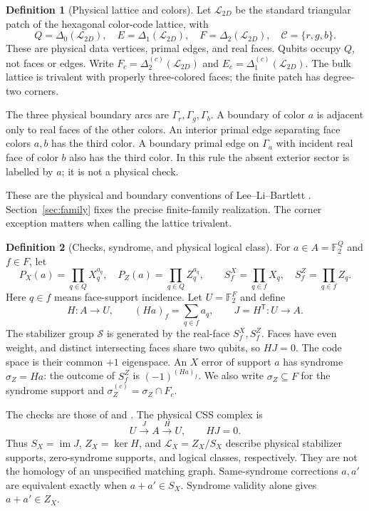 \documentclass[11pt]{article}
\theoremstyle{definition}
\newtheorem{definition}{Definition}[section]
\theoremstyle{plain}
\theoremstyle{remark}
\newcommand{\F}{\mathbb F_2}
\newcommand{\C}{\mathcal C}
\newcommand{\LL}{\mathcal L}
\begin{document}
\begin{definition}[Physical lattice and colors]\label{def:physical}
Let $\LL_{2D}$ be the standard triangular patch of the hexagonal color-code
lattice, with
\[
 Q=\Delta_0(\LL_{2D}),\quad E=\Delta_1(\LL_{2D}),\quad
 F=\Delta_2(\LL_{2D}),\quad \C=\{r,g,b\}.
\]
These are physical data vertices, primal edges, and real faces.
Qubits occupy $Q$, not faces or edges. Write
$F_c=\Delta_2^{(c)}(\LL_{2D})$ and $E_c=\Delta_1^{(c)}(\LL_{2D})$.
The bulk lattice is trivalent with properly three-colored faces; the
finite patch has degree-two corners.

The three physical boundary arcs are $\Gamma_r,\Gamma_g,\Gamma_b$.
A boundary of color $a$ is adjacent only to real faces of the other colors.
An interior primal edge separating face colors $a,b$ has the third color.
A boundary primal edge on $\Gamma_a$ with incident real face of color $b$
also has the third color. In this rule the absent exterior sector is
labelled by $a$; it is not a physical check.
\end{definition}

These are the physical and boundary conventions of
Lee--Li--Bartlett \cite[Sec.~2.1, pp.~3--4]{Lee}.
Section~\ref{sec:family} fixes the precise finite-family realization.
The corner exception matters when calling the lattice trivalent.

\begin{definition}[Checks, syndrome, and physical logical class]\label{def:checks}
For $a\in A=\F^Q$ and $f\in F$, let
\[
 P_X(a)=\prod_{q\in Q}X_q^{a_q},\quad
 P_Z(a)=\prod_{q\in Q}Z_q^{a_q},\qquad
 S_f^X=\prod_{q\in f}X_q,\quad S_f^Z=\prod_{q\in f}Z_q .
\]
Here $q\in f$ means face-support incidence. Let $U=\F^F$ and define
\[
 H:A\longrightarrow U,\qquad (Ha)_f=\sum_{q\in f}a_q,\qquad
 J=H^{\mathsf T}:U\longrightarrow A.
\]
The stabilizer group $\mathcal S$ is generated by the real-face
$S_f^X,S_f^Z$. Faces have even weight, and distinct intersecting faces
share two qubits, so $HJ=0$. The code space is their common $+1$
eigenspace. An $X$ error of support $a$ has syndrome $\sigma_Z=Ha$:
the outcome of $S_f^Z$ is $(-1)^{(Ha)_f}$. We also write
$\sigma_Z\subseteq F$ for the syndrome support and
$\sigma_Z^{(c)}=\sigma_Z\cap F_c$.
\end{definition}

The checks are those of \cite[Eq.~(1)]{Lee} and
\cite[Eq.~(1)]{Bombin}. The physical CSS complex is
\[
 U\xrightarrow{J}A\xrightarrow{H}U,\qquad HJ=0.
\]
Thus $S_X=\operatorname{im}J$, $Z_X=\ker H$, and
$\LL_X=Z_X/S_X$ describe physical stabilizer supports, zero-syndrome
supports, and logical classes, respectively. They are not the homology
of an unspecified matching graph. Same-syndrome corrections $a,a'$
are equivalent exactly when $a+a'\in S_X$. Syndrome validity alone gives
$a+a'\in Z_X$.
\end{document}
